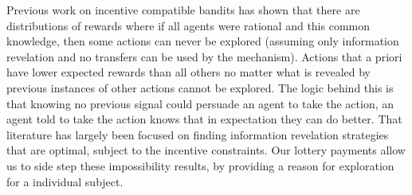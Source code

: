 Previous work on incentive compatible bandits \cite{kremer2014implementing,mansour2015bayesian} has shown that there are distributions of rewards where if all agents were rational and this common knowledge, then some actions can never be explored (assuming only information revelation and no transfers can be used by the mechanism). 
Actions that a priori have lower expected rewards than all others no matter what is revealed by previous instances of other actions cannot be explored.
The logic behind this is that knowing no previous signal could persuade an agent to take the action, an agent told to take the action knows that in expectation they can do better.
That literature has largely been focused on finding information revelation strategies that are optimal, subject to the incentive constraints. 
Our lottery payments allow us to side step these impossibility results, by providing a reason for exploration for a individual subject. 





